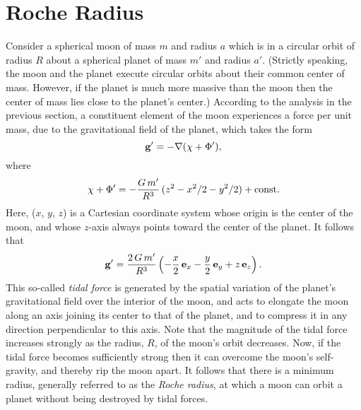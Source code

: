 \section{Roche Radius}\label{sroche}
Consider a spherical moon of mass $m$ and radius $a$ which is in a circular
orbit of radius $R$ about a spherical planet of mass $m'$ and radius $a'$.
(Strictly speaking, the moon and the planet execute circular orbits about
their common center of mass. However, if the planet is much more massive
than the moon then the center of mass lies close to the
planet's center.) According to the analysis in the previous section, a constituent  element of
the moon experiences a force per unit mass, due to the gravitational
field of the planet, which takes the form
\begin{equation}
{\bf g}' = - \nabla(\chi+\Phi'),
\end{equation}
where
\begin{equation}
\chi+\Phi' = - \frac{G\,m'}{R^3}\,(z^2-x^2/2-y^2/2)  + {\rm const}.
\end{equation}
Here, ($x$, $y$, $z$) is a Cartesian coordinate system whose origin
is the center of the moon, and whose $z$-axis always points toward the
center of the planet. It follows that
\begin{equation}\label{e13.90x}
{\bf g}' = \frac{2\,G\,m'}{R^3}\left(-\frac{x}{2}\,{\bf e}_x- \frac{y}{2}\,{\bf e}_y+ z\,{\bf e}_z\right).
\end{equation}
This so-called {\em tidal force}\/ is generated by the spatial variation of the
planet's gravitational field  over the interior of the moon, and acts
 to elongate the moon along an axis joining its center to that of the planet, and to compress it in any direction perpendicular
to this axis. Note that the magnitude of the tidal force increases strongly
as the radius, $R$, of the moon's orbit decreases. Now, if the tidal
force becomes sufficiently strong then it can overcome the moon's self-gravity, and thereby  rip the moon
apart. It follows that there is a minimum radius, generally referred to
as the {\em Roche radius}, at which a moon can orbit
a planet without being destroyed by tidal forces.  

